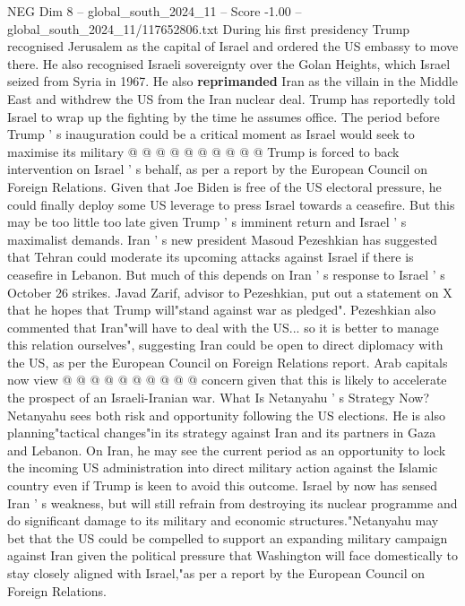 \begin{textsample}{NEG Dim 8 – global\_south\_2024\_11 – Score -1.00 – global\_south\_2024\_11/117652806.txt}
During his first presidency Trump recognised Jerusalem as the capital of Israel and ordered the US embassy to move there.
He also recognised Israeli sovereignty over the Golan Heights, which Israel seized from Syria in 1967.
He also \textbf{reprimanded} Iran as the villain in the Middle East and withdrew the US from the Iran nuclear deal.
Trump has reportedly told Israel to wrap up the fighting by the time he assumes office.
The period before Trump ' s inauguration could be a critical moment as Israel would seek to maximise its military @ @ @ @ @ @ @ @ @ @ Trump is forced to back intervention on Israel ' s behalf, as per a report by the European Council on Foreign Relations.
Given that Joe Biden is free of the US electoral pressure, he could finally deploy some US leverage to press Israel towards a ceasefire.
But this may be too little too late given Trump ' s imminent return and Israel ' s maximalist demands.
Iran ' s new president Masoud Pezeshkian has suggested that Tehran could moderate its upcoming attacks against Israel if there is ceasefire in Lebanon.
But much of this depends on Iran ' s response to Israel ' s October 26 strikes.
Javad Zarif, advisor to Pezeshkian, put out a statement on X that he hopes that Trump will"stand against war as pledged".
Pezeshkian also commented that Iran"will have to deal with the US... so it is better to manage this relation ourselves", suggesting Iran could be open to direct diplomacy with the US, as per the European Council on Foreign Relations report.
Arab capitals now view @ @ @ @ @ @ @ @ @ @ concern given that this is likely to accelerate the prospect of an Israeli-Iranian war.
What Is Netanyahu ' s Strategy Now?
Netanyahu sees both risk and opportunity following the US elections.
He is also planning"tactical changes"in its strategy against Iran and its partners in Gaza and Lebanon.
On Iran, he may see the current period as an opportunity to lock the incoming US administration into direct military action against the Islamic country even if Trump is keen to avoid this outcome.
Israel by now has sensed Iran ' s weakness, but will still refrain from destroying its nuclear programme and do significant damage to its military and economic structures."Netanyahu may bet that the US could be compelled to support an expanding military campaign against Iran given the political pressure that Washington will face domestically to stay closely aligned with Israel,"as per a report by the European Council on Foreign Relations.

\end{textsample}
